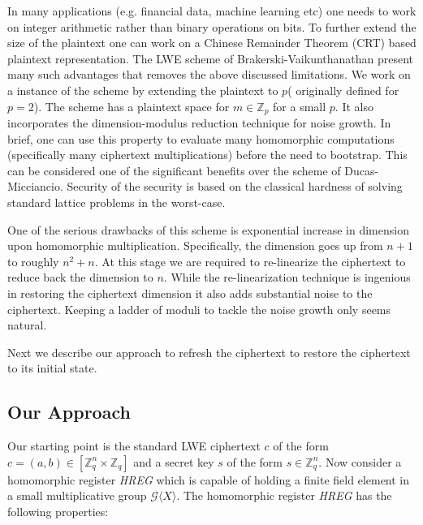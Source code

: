 \documentclass[10pt,journal,compsoc]{IEEEtran}
\theoremstyle{definition}
\begin{document}
In many applications (e.g. financial data, machine learning etc) one needs to work on integer arithmetic rather than binary operations on bits. To further extend the size of the plaintext one can work on a Chinese Remainder Theorem (CRT) based plaintext representation. The LWE scheme of Brakerski-Vaikunthanathan present many such advantages that removes the above discussed limitations. We work on a instance of the scheme by extending the plaintext to $p$( originally defined for $p = 2$). The scheme has a plaintext space for $m \in \mathbb{Z}_p$ for a small $p$. It also incorporates the dimension-modulus reduction technique for noise growth. In brief, one can use this property to evaluate many homomorphic computations (specifically many ciphertext multiplications) before the need to bootstrap. This can be considered one of the significant benefits over the scheme of Ducas-Micciancio. Security of the security is based on the classical hardness of solving standard lattice problems in the worst-case.

One of the serious drawbacks of this scheme is exponential increase in dimension upon homomorphic multiplication. Specifically, the dimension goes up from $n+1$ to roughly $n^2 + n$. At this stage we are required to re-linearize the ciphertext to reduce back the dimension to $n$. While the re-linearization technique is ingenious in restoring the ciphertext dimension it also adds substantial noise to the ciphertext. Keeping a ladder of moduli to tackle the noise growth only seems natural.

Next we describe our approach to refresh the ciphertext to restore the ciphertext to its initial state.

\subsection{Our Approach}
Our starting point is the standard LWE ciphertext $c$ of the form $c = \left(a,b\right) \in \left[\mathbb{Z}_q^n \times \mathbb{Z}_q\right]$ and a secret key $s$ of the form $s \in \mathbb{Z}_q^n$. Now consider a homomorphic register \textit{HREG} which is capable of holding a finite field element in a small multiplicative group $\mathcal{G}\langle X \rangle$. The homomorphic register \textit{HREG} has the following properties:
\end{document}
